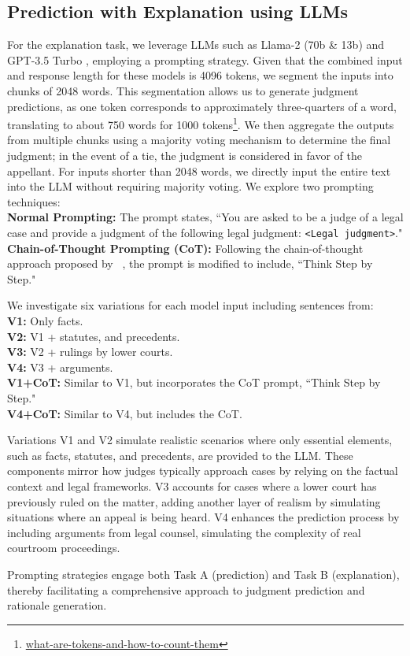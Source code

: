 \subsection{Prediction with Explanation using LLMs}
For the explanation task, we leverage LLMs such as Llama-2 (70b \& 13b) \cite{touvron2023llama} and GPT-3.5 Turbo \cite{brown2020language}, employing a prompting strategy. Given that the combined input and response length for these models is 4096 tokens, we segment the inputs into chunks of 2048 words. This segmentation allows us to generate judgment predictions, as one token corresponds to approximately three-quarters of a word, translating to about 750 words for 1000 tokens\footnote{\href{https://help.openai.com/en/articles/4936856-what-are-tokens-and-how-to-count-them}{what-are-tokens-and-how-to-count-them}}. We then aggregate the outputs from multiple chunks using a majority voting mechanism to determine the final judgment; in the event of a tie, the judgment is considered in favor of the appellant. For inputs shorter than 2048 words, we directly input the entire text into the LLM without requiring majority voting. We explore two prompting techniques:\\
\textbf{Normal Prompting:} The prompt states, ``You are asked to be a judge of a legal case and provide a judgment of the following legal judgment: \verb|<Legal judgment>|."\\
\textbf{Chain-of-Thought Prompting (CoT):} Following the chain-of-thought approach proposed by ~\cite{wei2022chain}, the prompt is modified to include, ``Think Step by Step."

We investigate six variations for each model input including sentences from:\\
\textbf{V1:} Only facts.\\
\textbf{V2:} V1 + statutes, and precedents.\\
\textbf{V3:} V2 + rulings by lower courts.\\
\textbf{V4:} V3 + arguments.\\
\textbf{V1+CoT:} Similar to V1, but incorporates the CoT prompt, ``Think Step by Step."\\
\textbf{V4+CoT:} Similar to V4, but includes the CoT.

Variations V1 and V2 simulate realistic scenarios where only essential elements, such as facts, statutes, and precedents, are provided to the LLM. These components mirror how judges typically approach cases by relying on the factual context and legal frameworks. V3 accounts for cases where a lower court has previously ruled on the matter, adding another layer of realism by simulating situations where an appeal is being heard. V4 enhances the prediction process by including arguments from legal counsel, simulating the complexity of real courtroom proceedings.

Prompting strategies engage both Task A (prediction) and Task B (explanation), thereby facilitating a comprehensive approach to judgment prediction and rationale generation.